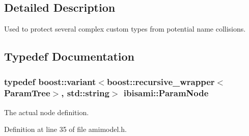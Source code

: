 \subsection{Detailed Description}
Used to protect several complex custom types from potential name collisions. 

\subsection{Typedef Documentation}
\hypertarget{namespaceibisami_a56481565abb44593a678738f57c04109}{}
\subsubsection[{Param\+Node}]{\setlength{\rightskip}{0pt plus 5cm}typedef boost\+::variant$<$boost\+::recursive\+\_\+wrapper$<${\bf Param\+Tree}$>$, std\+::string$>$ {\bf ibisami\+::\+Param\+Node}}\label{namespaceibisami_a56481565abb44593a678738f57c04109}
The actual node definition. 

Definition at line 35 of file amimodel.\+h.

